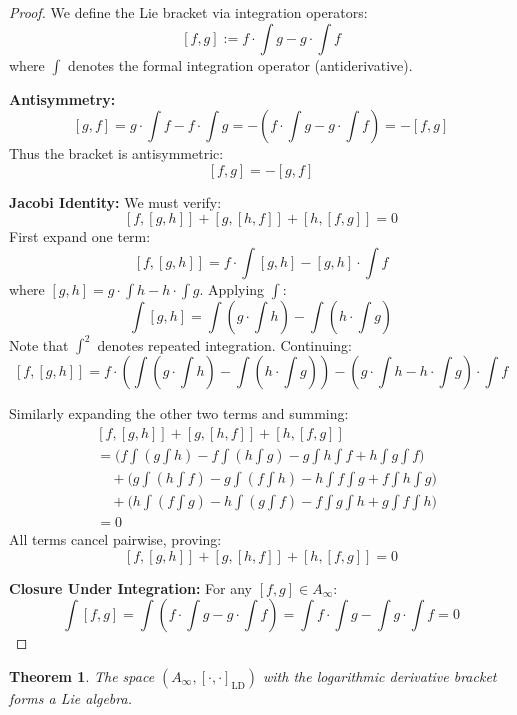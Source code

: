 \documentclass[10pt, oneside]{article}
\newtheorem{thm}{Theorem}
\begin{document}
\begin{proof}
We define the Lie bracket via integration operators:
\[
[f,g] := f \cdot \int g - g \cdot \int f
\]
where $\int $ denotes the formal integration operator (antiderivative).

\noindent\textbf{Antisymmetry:}
\[
[g,f] = g \cdot \int f - f \cdot \int g = - (f \cdot \int g - g \cdot \int f) = -[f,g]
\]
Thus the bracket is antisymmetric:
\[
\boxed{[f,g] = -[g,f]}
\]

\noindent\textbf{Jacobi Identity:}
We must verify:
\[
[f,[g,h]] + [g,[h,f]] + [h,[f,g]] = 0
\]
First expand one term:
\[
[f,[g,h]] = f \cdot \int [g,h] - [g,h] \cdot \int f
\]
where $[g,h] = g \cdot \int h - h \cdot \int g$. Applying $\int $:
\[
\int [g,h] = \int (g \cdot \int h) - \int (h \cdot \int g)
\]
Note that $\int ^2$ denotes repeated integration. Continuing:
\[
[f,[g,h]] = f \cdot (\int (g \cdot \int h) - \int (h \cdot \int g)) - (g \cdot \int h - h \cdot \int g) \cdot \int f
\]

Similarly expanding the other two terms and summing:
\[
\begin{aligned}
&[f,[g,h]] + [g,[h,f]] + [h,[f,g]] \\
&= \big(f \int (g \int h) - f \int (h \int g) - g \int h \int f + h \int g \int f\big) \\
&\quad + \big(g \int (h \int f) - g \int (f \int h) - h \int f \int g + f \int h \int g\big) \\
&\quad + \big(h \int (f \int g) - h \int (g \int f) - f \int g \int h + g \int f \int h\big) \\
&= 0
\end{aligned}
\]
All terms cancel pairwise, proving:
\[
\boxed{[f,[g,h]] + [g,[h,f]] + [h,[f,g]] = 0}
\]

\noindent\textbf{Closure Under Integration:}
For any $[f,g] \in A_\infty$:
\[
\int [f,g] = \int (f \cdot \int g - g \cdot \int f) = \int f \cdot \int g - \int g \cdot \int f = 0
\]
\end{proof}
   
   \begin{thm}
The space $(A_\infty, [\cdot,\cdot]_{\text{LD}})$ with the logarithmic derivative bracket forms a Lie algebra.
\end{thm}
\end{document}
